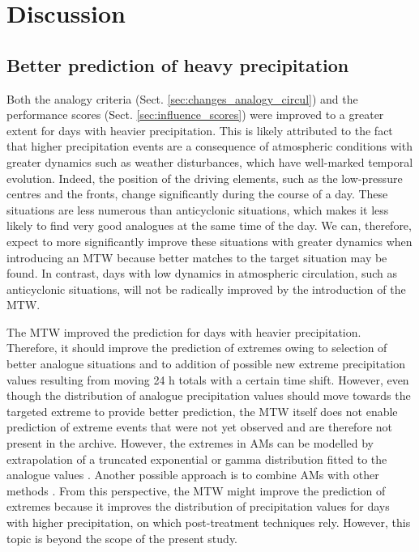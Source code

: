 \documentclass[hess, manuscript]{copernicus}
\begin{document}
	
	\section{Discussion}
	\label{sec:discussion}
	
	\subsection{Better prediction of heavy precipitation}
	
	Both the analogy criteria (Sect. \ref{sec:changes_analogy_circul}) and the performance scores (Sect. \ref{sec:influence_scores}) were improved to a greater extent for days with heavier precipitation. This is likely attributed to the fact that higher precipitation events are a consequence of atmospheric conditions with greater dynamics such as weather disturbances, which have well-marked temporal evolution. Indeed, the position of the driving elements, such as the low-pressure centres and the fronts, change significantly during the course of a day. These situations are less numerous than anticyclonic situations, which makes it less likely to find very good analogues at the same time of the day. We can, therefore, expect to more significantly improve these situations with greater dynamics when introducing an MTW because better matches to the target situation may be found. In contrast, days with low dynamics in atmospheric circulation, such as anticyclonic situations, will not be radically improved by the introduction of the MTW.
	
	The MTW improved the prediction for days with heavier precipitation. Therefore, it should improve the prediction of extremes owing to selection of better analogue situations and to addition of possible new extreme precipitation values resulting from moving 24 h totals with a certain time shift. However, even though the distribution of analogue precipitation values should move towards the targeted extreme to provide better prediction, the MTW itself does not enable prediction of extreme events that were not yet observed and are therefore not present in the archive. However, the extremes in AMs can be modelled by extrapolation of a truncated exponential or gamma distribution fitted to the analogue values \citep{Obled2002}. Another possible approach is to combine AMs with other methods \citep[e.g.][]{Chardon2014}. From this perspective, the MTW might improve the prediction of extremes because it improves the distribution of precipitation values for days with higher precipitation, on which post-treatment techniques rely. However, this topic is beyond the scope of the present study.
	
\end{document}
